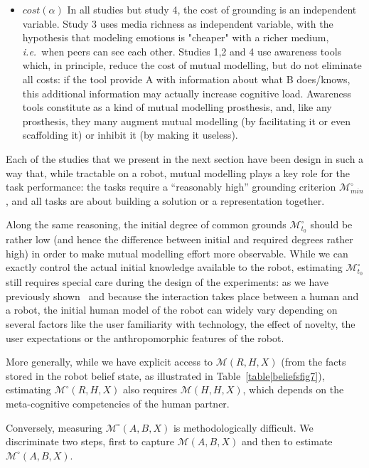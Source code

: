 \documentclass[twocolumn]{article}
\newcommand{\ie}{{\textit{i.e.\ }}}
\newcommand{\model}[3]{{$\mathcal{M}(#1, #2, #3)$}}
\newcommand{\Model}[3]{{$\mathcal{M}^{\circ}(#1, #2, #3)$}}
\newcommand{\groundingcriterion}{{$\mathcal{M}^{\circ}_{min}$}}
\newcommand{\inigrounding}{{$\mathcal{M}^{\circ}_{t_0}$}}
\begin{document}
\begin{itemize}
    \item $cost(\alpha)$ In all studies but study 4, the cost of  grounding is
        an independent variable. Study 3 uses media richness as independent
        variable, with the hypothesis that modeling emotions is "cheaper" with a
        richer medium, \ie  when peers can see each other.  Studies 1,2 and 4
        use awareness tools which, in principle, reduce the cost of mutual modelling, but do
        not eliminate all costs: if the tool provide A with information about
        what B does/knows, this additional information may actually increase
        cognitive load. Awareness tools constitute as a kind of mutual modelling prosthesis,
        and, like any prosthesis, they many augment mutual modelling (by facilitating it or
        even scaffolding it) or inhibit it (by making it useless).

\end{itemize}


Each of the studies that we present in the next section have been design in such a way that, while tractable on a
robot, mutual modelling plays a key role for the task performance: the tasks
require a ``reasonably high'' grounding criterion \groundingcriterion,
and all tasks are about building a solution or a representation together.

Along the same reasoning, the initial degree of common grounds \inigrounding
should be rather low (and hence the difference between initial and required
degrees rather high) in order to make mutual modelling effort more observable.
While we can exactly control the actual initial knowledge available to the
robot, estimating \inigrounding still requires special care during the design of
the experiments: as we have previously shown~\citep{lemaignan2014dynamics,
lemaignan2014cognitive} and because the interaction takes place between a human and
a robot, the initial human model of the robot can widely vary depending on
several factors like the user familiarity with technology, the effect of
novelty, the user expectations or the anthropomorphic features of the robot.

More generally, while we have explicit access to \model{R}{H}{X} (from the facts
stored in the robot belief state, as illustrated in
Table~\ref{table|beliefsfig7}), estimating \Model{R}{H}{X} also requires
\model{H}{H}{X}, which depends on the meta-cognitive competencies of the human
partner.

Conversely, measuring \Model{A}{B}{X} is methodologically difficult. We
discriminate two steps, first to capture \model{A}{B}{X} and then to
estimate \Model{A}{B}{X}. 
\end{document}
